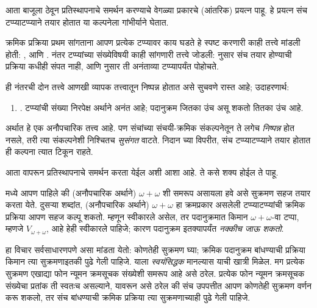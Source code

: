 \documentclass[../../../include/open-logic-section]{subfiles}
\begin{document}

आता \limofsize{} बाजूला ठेवून प्रतिस्थापनाचे समर्थन करण्याचे वेगळ्या प्रकारचे (आंतरिक) प्रयत्न पाहू. हे प्रयत्न संच टप्प्याटप्प्याने तयार होतात या कल्पनेला गांभीर्याने घेतात.

क्रमिक प्रक्रिया प्रथम सांगताना आपण प्रत्येक टप्प्यावर काय घडते हे स्पष्ट करणारी काही तत्त्वे मांडली होती: \stageshier, \stagesord आणि \stagesacc. नंतर टप्प्यांच्या संख्येविषयी काही सांगणारी तत्त्वे जोडली: \stagessucc{} नुसार संच तयार होण्याची प्रक्रिया कधीही संपत नाही, आणि \stagesinf{} नुसार ती अनंताव्या टप्प्यापर्यंत पोहोचते.

ही नंतरची दोन तत्त्वे आणखी व्यापक तत्त्वातून निष्पन्न होतात असे सुचवणे रास्त आहे; उदाहरणार्थ:
\begin{enumerate}
  \item[] \stagesinex. टप्प्यांची संख्या निरपेक्ष अर्थाने अनंत आहे; पदानुक्रम जितका उंच असू शकतो तितका उंच आहे.
\end{enumerate}
अर्थात हे एक अनौपचारिक तत्त्व आहे. पण संचांच्या संचयी-क्रमिक संकल्पनेतून ते लगेच \emph{निष्पन्न} होत नसले, तरी त्या संकल्पनेशी निश्चितच \emph{सुसंगत} वाटते. निदान \limofsize{} च्या विपरीत, संच टप्प्याटप्प्याने तयार होतात ही कल्पना त्यात टिकून राहते.

आता \stagesinex{} वापरून प्रतिस्थापनाचे समर्थन करता येईल अशी आशा आहे. ते कसे शक्य होईल ते पाहू.

 मध्ये आपण पाहिले की (अनौपचारिक अर्थाने) $\omega+\omega$ शी समरूप असायला हवे असे सुक्रमण सहज तयार करता येते. दुसऱ्या शब्दांत, (अनौपचारिक अर्थाने) $\omega+\omega$ हा क्रमप्रकार असलेली टप्प्याटप्प्यांची क्रमिक प्रक्रिया आपण सहज कल्पू शकतो. म्हणून \stagesinex{} स्वीकारले असेल, तर पदानुक्रमात किमान $\omega+\omega$-वा टप्पा, म्हणजे $V_{\omega+\omega}$, आहे हेही स्वीकारले पाहिजे; कारण पदानुक्रम इतक्यापर्यंत \emph{नक्कीच जाऊ शकतो}.

हा विचार सर्वसाधारणपणे असा मांडता येतो: कोणतेही सुक्रमण घ्या; क्रमिक पदानुक्रम बांधण्याची प्रक्रिया किमान त्या सुक्रमणाइतकी पुढे गेली पाहिजे.  याला \emph{स्वयंसिद्धक} मानल्यास याची खात्री मिळेल. मग प्रत्येक सुक्रमण एखाद्या फोन न्यूमन क्रमसूचक संख्येशी समरूप आहे असे ठरेल. प्रत्येक फोन न्यूमन क्रमसूचक संख्येचा प्रतांक ती स्वतःच असल्याने,  यावरून असे ठरेल की संच उपपत्तीत आपण कोणतेही सुक्रमण वर्णन करू शकलो, तर संच बांधण्याची क्रमिक प्रक्रिया त्या सुक्रमणाच्याही पुढे गेली पाहिजे.
\end{document}
